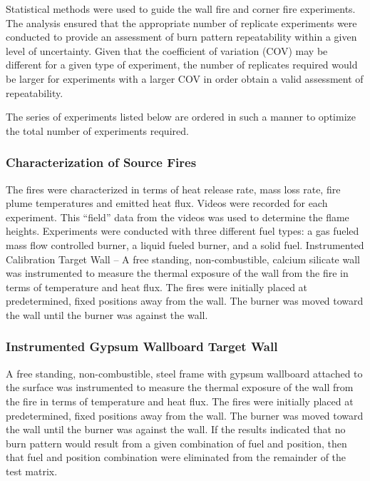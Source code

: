 \documentclass[twoside]{uocthesis}
\begin{document}
Statistical methods were used to guide the wall fire and corner fire experiments.  The analysis ensured that the appropriate number of replicate experiments were conducted to provide an assessment of burn pattern repeatability within a given level of uncertainty.  Given that the coefficient of variation (COV) may be different for a given type of experiment, the number of replicates required would be larger for experiments with a larger COV in order obtain a valid assessment of repeatability. 
  
The series of experiments listed below are ordered in such a manner to optimize the total number of experiments required. 

\subsubsection{Characterization of Source Fires}

The fires were characterized in terms of heat release rate, mass loss rate, fire plume temperatures and emitted heat flux. Videos were recorded for each experiment.  This “field” data from the videos was  used to determine the flame heights. Experiments were conducted with three different fuel types: a gas fueled mass flow controlled burner, a liquid fueled burner, and a solid fuel.
Instrumented Calibration Target Wall – A free standing, non-combustible, calcium silicate wall was instrumented to measure the thermal exposure of the wall from the fire in terms of temperature and heat flux.  The fires were initially placed at predetermined, fixed positions away from the wall. The burner was moved toward the wall until the burner was against the wall. 
 
\subsubsection{Instrumented Gypsum Wallboard Target Wall}

A free standing, non-combustible, steel frame with gypsum wallboard attached to the surface was instrumented to measure the thermal exposure of the wall from the fire in terms of temperature and heat flux.  The fires were initially placed at predetermined, fixed positions away from the wall. The burner was moved toward the wall until the burner was against the wall.  If the results indicated that no burn pattern would result from a given combination of fuel and position, then that fuel and position combination were eliminated from the remainder of the test matrix.
\end{document}
